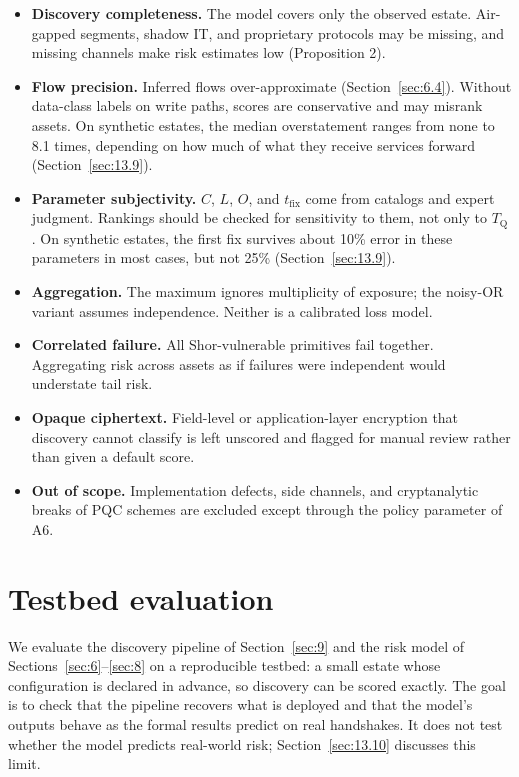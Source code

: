 \documentclass[conference]{IEEEtran}
\newcommand{\Tq}{T_{\mathrm{Q}}}
\newcommand{\tfix}{t_{\mathrm{fix}}}
\begin{document}
\begin{itemize}
\item \textbf{Discovery completeness.} The model covers only the observed estate. Air-gapped segments, shadow IT, and proprietary protocols may be missing, and missing channels make risk estimates low (Proposition 2).
\item \textbf{Flow precision.} Inferred flows over-approximate (Section~\ref{sec:6.4}). Without data-class labels on write paths, scores are conservative and may misrank assets. On synthetic estates, the median overstatement ranges from none to 8.1 times, depending on how much of what they receive services forward (Section~\ref{sec:13.9}).
\item \textbf{Parameter subjectivity.} $C$, $L$, $O$, and $\tfix$ come from catalogs and expert judgment. Rankings should be checked for sensitivity to them, not only to $\Tq$. On synthetic estates, the first fix survives about 10\% error in these parameters in most cases, but not 25\% (Section~\ref{sec:13.9}).
\item \textbf{Aggregation.} The maximum ignores multiplicity of exposure; the noisy-OR variant assumes independence. Neither is a calibrated loss model.
\item \textbf{Correlated failure.} All Shor-vulnerable primitives fail together. Aggregating risk across assets as if failures were independent would understate tail risk.
\item \textbf{Opaque ciphertext.} Field-level or application-layer encryption that discovery cannot classify is left unscored and flagged for manual review rather than given a default score.
\item \textbf{Out of scope.} Implementation defects, side channels, and cryptanalytic breaks of PQC schemes are excluded except through the policy parameter of A6.
\end{itemize}

\section{Testbed evaluation}\label{sec:13}

We evaluate the discovery pipeline of Section~\ref{sec:9} and the risk model of Sections~\ref{sec:6}--\ref{sec:8} on a reproducible testbed: a small estate whose configuration is declared in advance, so discovery can be scored exactly. The goal is to check that the pipeline recovers what is deployed and that the model's outputs behave as the formal results predict on real handshakes. It does not test whether the model predicts real-world risk; Section~\ref{sec:13.10} discusses this limit.
\end{document}
